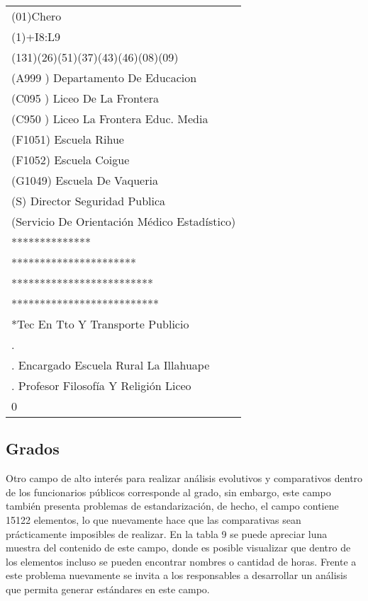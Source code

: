 \documentclass[11pt]{article}
\begin{document}
    
    \begin{tabular}{l}
\toprule
                                    (01)Chero \\
                                    (1)+I8:L9 \\
            (131)(26)(51)(37)(43)(46)(08)(09) \\
            (A999 ) Departamento De Educacion \\
                 (C095 ) Liceo De La Frontera \\
        (C950 ) Liceo La Frontera Educ. Media \\
                        (F1051) Escuela Rihue \\
                       (F1052) Escuela Coigue \\
                  (G1049) Escuela De Vaqueria \\
               (S) Director Seguridad Publica \\
 (Servicio De Orientación Médico Estadístico) \\
                               ************** \\
                       ********************** \\
                    ************************* \\
                   ************************** \\
            *Tec En Tto Y Transporte Publicio \\
                                            . \\
      . Encargado  Escuela Rural La Illahuape \\
        . Profesor Filosofía Y Religión Liceo \\
                                            0 \\
\bottomrule
\end{tabular}

    
    \hypertarget{grados}{%
\subsection{Grados}\label{grados}}

    Otro campo de alto interés para realizar análisis evolutivos y
comparativos dentro de los funcionarios públicos corresponde al grado,
sin embargo, este campo también presenta problemas de estandarización,
de hecho, el campo contiene 15122 elementos, lo que nuevamente hace que
las comparativas sean prácticamente imposibles de realizar. En la tabla
9 se puede apreciar luna muestra del contenido de este campo, donde es
posible visualizar que dentro de los elementos incluso se pueden
encontrar nombres o cantidad de horas. Frente a este problema nuevamente
se invita a los responsables a desarrollar un análisis que permita
generar estándares en este campo.
\end{document}
